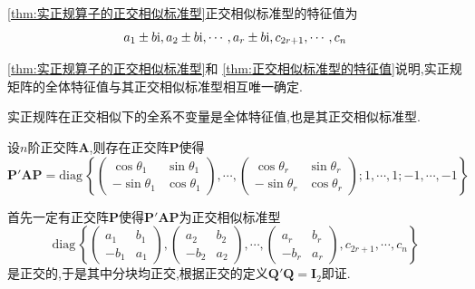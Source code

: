 \begin{formal}
    \begin{theorem}[正交相似标准型的特征值]\label{thm:正交相似标准型的特征值}
        \cref{thm:实正规算子的正交相似标准型}正交相似标准型的特征值为\[
        a_1\pm b\mathrm{i},a_2\pm b\mathrm{i},\cdots,a_r\pm b\mathrm{i},c_{2r+1},\cdots,c_n
        \]
    \end{theorem}
\end{formal}
\begin{red}
    \begin{remark}
  \cref{thm:实正规算子的正交相似标准型}和      \cref{thm:正交相似标准型的特征值}说明,实正规矩阵的全体特征值与其正交相似标准型相互唯一确定.
    \end{remark}
\end{red}
\begin{formal}
    \begin{theorem}[实正规阵在正交相似下的全系不变量]\label{thm:实正规阵在正交相似下的全系不变量}
        实正规阵在正交相似下的全系不变量是全体特征值,也是其正交相似标准型.
    \end{theorem}
\end{formal}
\begin{green}
    \begin{corollary}[旋转对角阵]\label{cor:旋转对角阵}
        设$n$阶正交阵$\bm{A}$,则存在正交阵$\bm{P}$使得\[
        \bm{P}'\bm{AP}=\mathrm{diag}\,\left\{
            \begin{pmatrix}
                \cos\theta_1&\sin\theta_1\\
                -\sin\theta_1&\cos\theta_1
            \end{pmatrix},\cdots,\begin{pmatrix}
                \cos\theta_r&\sin\theta_r\\
                -\sin\theta_r&\cos\theta_r
            \end{pmatrix};1,\cdots,1;-1,\cdots,-1
        \right\}
        \]
    \end{corollary}
    \begin{Proof}
        首先一定有正交阵$\bm{P}$使得$\bm{P}'\bm{AP}$为正交相似标准型\[
        \mathrm{diag}\,\left\{
            \begin{pmatrix}
                a_1&b_1\\
                -b_1&a_1
            \end{pmatrix},\begin{pmatrix}
                a_2&b_2\\
                -b_2&a_2
            \end{pmatrix},\cdots,\begin{pmatrix}
                a_r&b_r\\
                -b_r&a_r
                \end{pmatrix},c_{2r+1},\cdots,c_n
        \right\}
        \]是正交的,于是其中分块均正交,根据正交的定义$\bm{Q}'\bm{Q}=\bm{I}_2$即证.
    \end{Proof}
\end{green}
